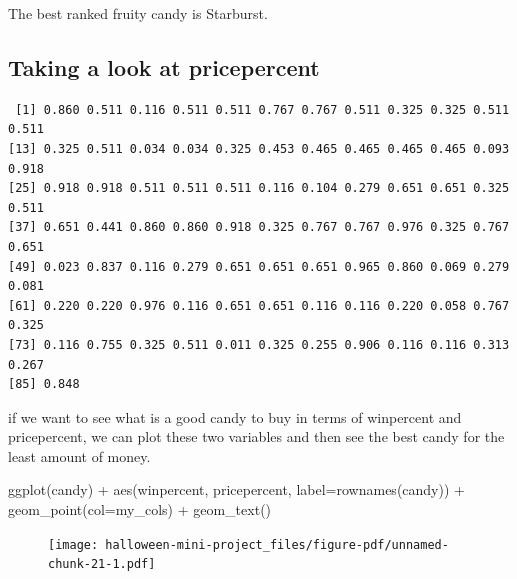 \documentclass[
  letterpaper,
  DIV=11,
  numbers=noendperiod]{scrartcl}
\newenvironment{Shaded}{\begin{snugshade}}{\end{snugshade}}
\newcommand{\AttributeTok}[1]{\textcolor[rgb]{0.40,0.45,0.13}{#1}}
\newcommand{\FunctionTok}[1]{\textcolor[rgb]{0.28,0.35,0.67}{#1}}
\newcommand{\NormalTok}[1]{\textcolor[rgb]{0.00,0.23,0.31}{#1}}
\newcommand{\SpecialCharTok}[1]{\textcolor[rgb]{0.37,0.37,0.37}{#1}}
\begin{document}
The best ranked fruity candy is Starburst.

\hypertarget{taking-a-look-at-pricepercent}{%
\subsection{Taking a look at
pricepercent}\label{taking-a-look-at-pricepercent}}

\begin{Shaded}
\end{Shaded}

\begin{verbatim}
 [1] 0.860 0.511 0.116 0.511 0.511 0.767 0.767 0.511 0.325 0.325 0.511 0.511
[13] 0.325 0.511 0.034 0.034 0.325 0.453 0.465 0.465 0.465 0.465 0.093 0.918
[25] 0.918 0.918 0.511 0.511 0.511 0.116 0.104 0.279 0.651 0.651 0.325 0.511
[37] 0.651 0.441 0.860 0.860 0.918 0.325 0.767 0.767 0.976 0.325 0.767 0.651
[49] 0.023 0.837 0.116 0.279 0.651 0.651 0.651 0.965 0.860 0.069 0.279 0.081
[61] 0.220 0.220 0.976 0.116 0.651 0.651 0.116 0.116 0.220 0.058 0.767 0.325
[73] 0.116 0.755 0.325 0.511 0.011 0.325 0.255 0.906 0.116 0.116 0.313 0.267
[85] 0.848
\end{verbatim}

if we want to see what is a good candy to buy in terms of winpercent and
pricepercent, we can plot these two variables and then see the best
candy for the least amount of money.

\begin{Shaded}
\begin{Highlighting}[]
\FunctionTok{ggplot}\NormalTok{(candy) }\SpecialCharTok{+} 
  \FunctionTok{aes}\NormalTok{(winpercent, pricepercent, }\AttributeTok{label=}\FunctionTok{rownames}\NormalTok{(candy)) }\SpecialCharTok{+}
  \FunctionTok{geom\_point}\NormalTok{(}\AttributeTok{col=}\NormalTok{my\_cols) }\SpecialCharTok{+}
  \FunctionTok{geom\_text}\NormalTok{()}
\end{Highlighting}
\end{Shaded}

\begin{figure}[H]

{\centering \texttt{[image: halloween-mini-project\_files/figure-pdf/unnamed-chunk-21-1.pdf]}

}

\end{figure}
\end{document}
